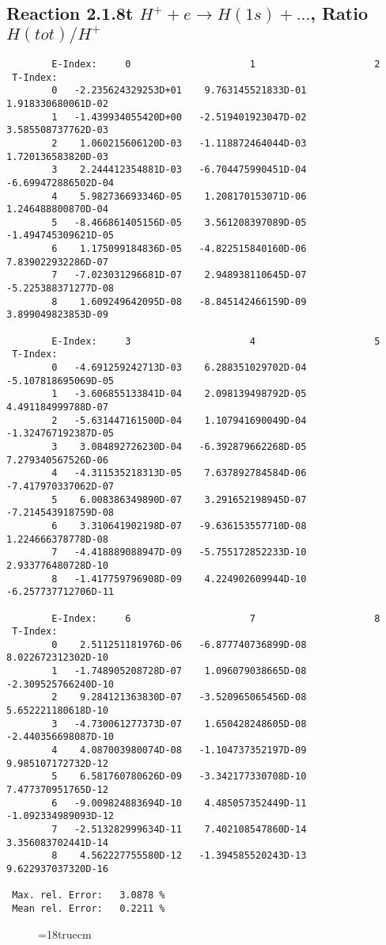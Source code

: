 \subsection{
Reaction 2.1.8t  $H^+ + e \rightarrow H(1s) + ...$, Ratio $H(tot)/H^+$
}

\begin{verbatim}
        E-Index:     0                     1                     2
 T-Index:
        0   -2.235624329253D+01    9.763145521833D-01    1.918330680061D-02
        1   -1.439934055420D+00   -2.519401923047D-02    3.585508737762D-03
        2    1.060215606120D-03   -1.118872464044D-03    1.720136583820D-03
        3    2.244412354881D-03   -6.704475990451D-04   -6.699472886502D-04
        4    5.982736693346D-05    1.208170153071D-06    1.246488800870D-04
        5   -8.466861405156D-05    3.561208397089D-05   -1.494745309621D-05
        6    1.175099184836D-05   -4.822515840160D-06    7.839022932286D-07
        7   -7.023031296681D-07    2.948938110645D-07   -5.225388371277D-08
        8    1.609249642095D-08   -8.845142466159D-09    3.899049823853D-09

        E-Index:     3                     4                     5
 T-Index:
        0   -4.691259242713D-03    6.288351029702D-04   -5.107818695069D-05
        1   -3.606855133841D-04    2.098139498792D-05    4.491184999788D-07
        2   -5.631447161500D-04    1.107941690049D-04   -1.324767192387D-05
        3    3.084892726230D-04   -6.392879662268D-05    7.279340567526D-06
        4   -4.311535218313D-05    7.637892784584D-06   -7.417970337062D-07
        5    6.008386349890D-07    3.291652198945D-07   -7.214543918759D-08
        6    3.310641902198D-07   -9.636153557710D-08    1.224666378778D-08
        7   -4.418889088947D-09   -5.755172852233D-10    2.933776480728D-10
        8   -1.417759796908D-09    4.224902609944D-10   -6.257737712706D-11

        E-Index:     6                     7                     8
 T-Index:
        0    2.511251181976D-06   -6.877740736899D-08    8.022672312302D-10
        1   -1.748905208728D-07    1.096079038665D-08   -2.309525766240D-10
        2    9.284121363830D-07   -3.520965065456D-08    5.652221180618D-10
        3   -4.730061277373D-07    1.650428248605D-08   -2.440356698087D-10
        4    4.087003980074D-08   -1.104737352197D-09    9.985107172732D-12
        5    6.581760780626D-09   -3.342177330708D-10    7.477370951765D-12
        6   -9.009824883694D-10    4.485057352449D-11   -1.092334989093D-12
        7   -2.513282999634D-11    7.402108547860D-14    3.356083702441D-14
        8    4.562227755580D-12   -1.394585520243D-13    9.622937037320D-16

 Max. rel. Error:   3.0878 %
 Mean rel. Error:   0.2211 %

\end{verbatim}
\begin{figure} \label{2.1.8rt}
\epsfxsize=18truecm
\end{figure}
\newpage



